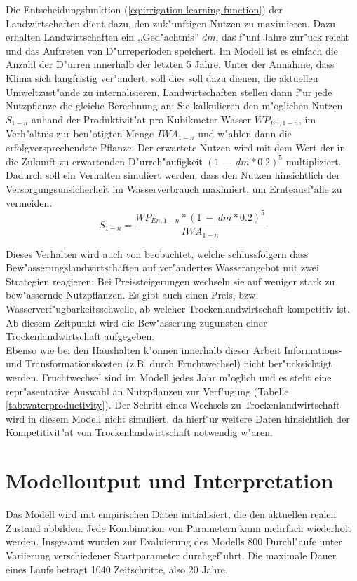 \documentclass[11pt,a4paper]{article}
\begin{document}
Die Entscheidungsfunktion (\ref{eq:irrigation-learning-function}) der Landwirtschaften dient dazu, den zuk"unftigen Nutzen zu maximieren. Dazu erhalten Landwirtschaften ein ,,Ged"achtnis'' $dm$, das f"unf Jahre zur"uck reicht und das Auftreten von D"urre\-perioden speichert. Im Modell ist es einfach die Anzahl der D"urren innerhalb der letzten 5 Jahre. Unter der Annahme, dass Klima sich langfristig ver"andert, soll dies soll dazu dienen, die aktuellen Umweltzust"ande zu internalisieren. Landwirtschaften stellen dann f"ur jede Nutzpflanze die gleiche Berechnung an: Sie kalkulieren den m"oglichen Nutzen $S_{1-n}$ anhand der Produktivit"at pro Kubikmeter Wasser $WP_{En, 1-n}$, im Verh"altnis zur ben"otigten Menge $IWA_{1-n}$ und w"ahlen dann die erfolgversprechendste Pflanze. Der erwartete Nutzen wird mit dem Wert der in die Zukunft zu erwartenden D"urreh"aufigkeit $(1\:-\: dm * 0.2)^{5}$ multipliziert. Dadurch soll ein Verhalten simuliert werden, dass den Nutzen hinsichtlich der Versorgungsunsicherheit im Wasserverbrauch maximiert, um Ernteausf"alle zu vermeiden.\\


\begin{dmath}
S_{1-n} = \frac{WP_{En, 1-n} * (1\:-\: dm * 0.2)^{5}}{IWA_{1-n}}
\label{eq:irrigation-learning-function}
\end{dmath}

Dieses Verhalten wird auch von \cite{Varela-Ortega1998} beobachtet, welche schlussfolgern dass Bew"asserungslandwirtschaften auf ver"andertes Wasserangebot mit zwei Strategien reagieren: Bei Preissteigerungen wechseln sie auf weniger stark zu bew"assernde Nutzpflanzen. Es gibt auch einen Preis, bzw. Wasserverf"ugbarkeitsschwelle, ab welcher Trocken\-land\-wirt\-schaft kompetitiv ist. Ab diesem Zeitpunkt wird die Bew"asserung zugunsten einer Trockenlandwirtschaft aufgegeben.\\
Ebenso wie bei den Haushalten k"onnen innerhalb dieser Arbeit Informations- und Transformationskosten (z.B. durch Fruchtwechsel) nicht ber"ucksichtigt werden. Fruchtwechsel sind im Modell jedes Jahr m"oglich und es steht eine repr"asentative Auswahl an Nutzpflanzen zur Verf"ugung (Tabelle \ref{tab:waterproductivity}). Der Schritt eines Wechsels zu Trocken\-land\-wirt\-schaft wird in diesem Modell nicht simuliert, da hierf"ur weitere Daten hinsichtlich der Kompetitivit"at von Trockenlandwirtschaft notwendig w"aren.

\newpage

\section{Modelloutput und Interpretation}
\label{sec:Modelloutput}
Das Modell wird mit empirischen Daten initialisiert, die den aktuellen realen Zustand abbilden. Jede Kombination von Parametern kann mehrfach wiederholt werden. Insgesamt wurden zur Evaluierung des Modells 800 Durchl"aufe unter Variierung verschiedener Startparameter durchgef"uhrt. Die maximale Dauer eines Laufs betragt 1040 Zeitschritte, also 20 Jahre.
\end{document}
